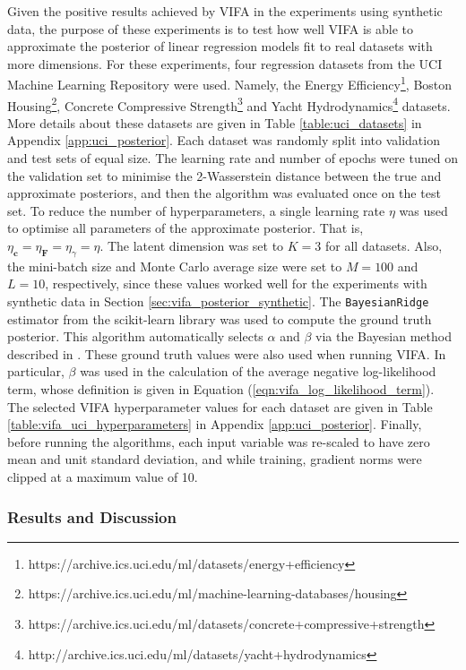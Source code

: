 \documentclass[msc,deptreport.inf]{infthesis} %
\newcommand{\matr}[1]{\mathbf{#1}}
\begin{document}
Given the positive results achieved by VIFA in the experiments using synthetic data, the purpose of these experiments is to test how well VIFA is able to approximate the posterior of linear regression models fit to real datasets with more dimensions. For these experiments, four regression datasets from the UCI Machine Learning Repository \cite{dua2019} were used. Namely, the Energy Efficiency\footnote{https://archive.ics.uci.edu/ml/datasets/energy+efficiency}, Boston Housing\footnote{https://archive.ics.uci.edu/ml/machine-learning-databases/housing}, Concrete Compressive Strength\footnote{https://archive.ics.uci.edu/ml/datasets/concrete+compressive+strength} and Yacht Hydrodynamics\footnote{http://archive.ics.uci.edu/ml/datasets/yacht+hydrodynamics} datasets. More details about these datasets are given in Table \ref{table:uci_datasets} in Appendix \ref{app:uci_posterior}. Each dataset was randomly split into validation and test sets of equal size. The learning rate and number of epochs were tuned on the validation set to minimise the 2-Wasserstein distance between the true and approximate posteriors, and then the algorithm was evaluated once on the test set. To reduce the number of hyperparameters, a single learning rate $\eta$ was used to optimise all parameters of the approximate posterior. That is, $\eta_\matr{c} = \eta_\matr{F} = \eta_\gamma = \eta$. The latent dimension was set to $K=3$ for all datasets. Also, the mini-batch size and Monte Carlo average size were set to $M=100$ and $L=10$, respectively, since these values worked well for the experiments with synthetic data in Section \ref{sec:vifa_posterior_synthetic}. The \texttt{BayesianRidge} estimator from the scikit-learn library \cite{pedregosa2012} was used to compute the ground truth posterior. This algorithm automatically selects $\alpha$ and $\beta$ via the Bayesian method described in \cite{mackay1992}. These ground truth values were also used when running VIFA. In particular, $\beta$ was used in the calculation of the average negative log-likelihood term, whose definition is given in Equation (\ref{eqn:vifa_log_likelihood_term}). The selected VIFA hyperparameter values for each dataset are given in Table \ref{table:vifa_uci_hyperparameters} in Appendix \ref{app:uci_posterior}. Finally, before running the algorithms, each input variable was re-scaled to have zero mean and unit standard deviation, and while training, gradient norms were clipped at a maximum value of 10. 


\subsubsection{Results and Discussion}
\end{document}
